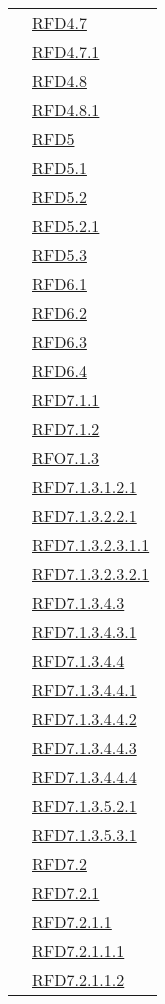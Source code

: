\begin{longtable}{|>{\centering}m{5cm}|m{5cm}<{\centering}|}
& \hyperlink{RFD4.7}{RFD4.7}\\
& \hyperlink{RFD4.7.1}{RFD4.7.1}\\
& \hyperlink{RFD4.8}{RFD4.8}\\
& \hyperlink{RFD4.8.1}{RFD4.8.1}\\
& \hyperlink{RFD5}{RFD5}\\
& \hyperlink{RFD5.1}{RFD5.1}\\
& \hyperlink{RFD5.2}{RFD5.2}\\
& \hyperlink{RFD5.2.1}{RFD5.2.1}\\
& \hyperlink{RFD5.3}{RFD5.3}\\
& \hyperlink{RFD6.1}{RFD6.1}\\
& \hyperlink{RFD6.2}{RFD6.2}\\
& \hyperlink{RFD6.3}{RFD6.3}\\
& \hyperlink{RFD6.4}{RFD6.4}\\
& \hyperlink{RFD7.1.1}{RFD7.1.1}\\
& \hyperlink{RFD7.1.2}{RFD7.1.2}\\
& \hyperlink{RFO7.1.3}{RFO7.1.3}\\
& \hyperlink{RFD7.1.3.1.2.1}{RFD7.1.3.1.2.1}\\
& \hyperlink{RFD7.1.3.2.2.1}{RFD7.1.3.2.2.1}\\
& \hyperlink{RFD7.1.3.2.3.1.1}{RFD7.1.3.2.3.1.1}\\
& \hyperlink{RFD7.1.3.2.3.2.1}{RFD7.1.3.2.3.2.1}\\
& \hyperlink{RFD7.1.3.4.3}{RFD7.1.3.4.3}\\
& \hyperlink{RFD7.1.3.4.3.1}{RFD7.1.3.4.3.1}\\
& \hyperlink{RFD7.1.3.4.4}{RFD7.1.3.4.4}\\
& \hyperlink{RFD7.1.3.4.4.1}{RFD7.1.3.4.4.1}\\
& \hyperlink{RFD7.1.3.4.4.2}{RFD7.1.3.4.4.2}\\
& \hyperlink{RFD7.1.3.4.4.3}{RFD7.1.3.4.4.3}\\
& \hyperlink{RFD7.1.3.4.4.4}{RFD7.1.3.4.4.4}\\
& \hyperlink{RFD7.1.3.5.2.1}{RFD7.1.3.5.2.1}\\
& \hyperlink{RFD7.1.3.5.3.1}{RFD7.1.3.5.3.1}\\
& \hyperlink{RFD7.2}{RFD7.2}\\
& \hyperlink{RFD7.2.1}{RFD7.2.1}\\
& \hyperlink{RFD7.2.1.1}{RFD7.2.1.1}\\
& \hyperlink{RFD7.2.1.1.1}{RFD7.2.1.1.1}\\
& \hyperlink{RFD7.2.1.1.2}{RFD7.2.1.1.2}\\

\end{longtable}
